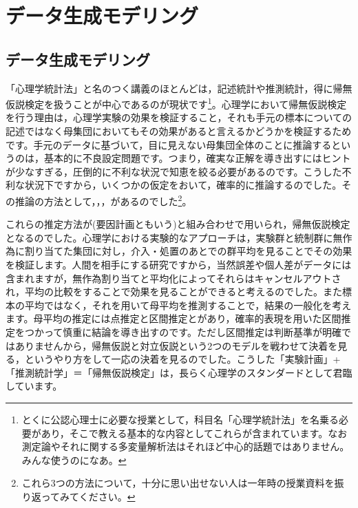 \documentclass{ltjsbook}
\begin{document}
\chapter{データ生成モデリング}
\label{x17_Bayesian}

\section{データ生成モデリング}
「心理学統計法」と名のつく講義のほとんどは，記述統計や推測統計，得に帰無仮説検定を扱うことが中心であるのが現状です\footnote{とくに公認心理士に必要な授業として，科目名「心理学統計法」を名乗る必要があり，そこで教える基本的な内容としてこれらが含まれています。なお測定論やそれに関する多変量解析法はそれほど中心的話題ではありません。みんな使うのになあ。}。心理学において帰無仮説検定を行う理由は，心理学実験の効果を検証すること，それも手元の標本についての記述ではなく母集団においてもその効果があると言えるかどうかを検証するためです。手元のデータに基づいて，目に見えない母集団全体のことに推論するというのは，基本的に不良設定問題です。つまり，確実な正解を導き出すにはヒントが少なすぎる，圧倒的に不利な状況で知恵を絞る必要があるのです。こうした不利な状況下ですから，いくつかの仮定をおいて，確率的に推論するのでした。その推論の方法として，，，があるのでした\footnote{これら3つの方法について，十分に思い出せない人は一年時の授業資料を振り返ってみてください。}。

これらの推定方法が(要因計画ともいう)と組み合わせで用いられ，帰無仮説検定となるのでした。心理学における実験的なアプローチは，実験群と統制群に無作為に割り当てた集団に対し，介入・処置のあとでの群平均を見ることでその効果を検証します。人間を相手にする研究ですから，当然誤差や個人差がデータには含まれますが，無作為割り当てと平均化によってそれらはキャンセルアウトされ，平均の比較をすることで効果を見ることができると考えるのでした。また標本の平均ではなく，それを用いて母平均を推測することで，結果の一般化を考えます。母平均の推定には点推定と区間推定とがあり，確率的表現を用いた区間推定をつかって慎重に結論を導き出すのです。ただし区間推定は判断基準が明確ではありませんから，帰無仮説と対立仮説という2つのモデルを戦わせて決着を見る，というやり方をして一応の決着を見るのでした。こうした「実験計画」+「推測統計学」＝「帰無仮説検定」は，長らく心理学のスタンダードとして君臨しています。
\end{document}
